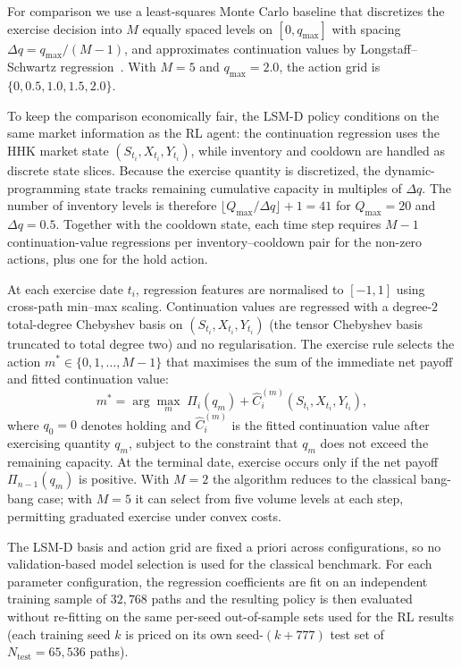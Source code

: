 \documentclass[a4paper,fleqn]{cas-dc}
\begin{document}
For comparison we use a least-squares Monte Carlo baseline that discretizes the exercise decision into $M$ equally spaced levels on $[0,q_{\max}]$ with spacing $\Delta q = q_{\max}/(M-1)$, and approximates continuation values by Longstaff--Schwartz regression~\cite{longstaff2001valuing}. With $M = 5$ and $q_{\max} = 2.0$, the action grid is $\{0, 0.5, 1.0, 1.5, 2.0\}$.

To keep the comparison economically fair, the LSM-D policy conditions on the same market information as the RL agent: the continuation regression uses the HHK market state $(S_{t_i},X_{t_i},Y_{t_i})$, while inventory and cooldown are handled as discrete state slices. Because the exercise quantity is discretized, the dynamic-programming state tracks remaining cumulative capacity in multiples of $\Delta q$. The number of inventory levels is therefore $\lfloor Q_{\max}/\Delta q \rfloor + 1 = 41$ for $Q_{\max} = 20$ and $\Delta q = 0.5$. Together with the cooldown state, each time step requires $M - 1$ continuation-value regressions per inventory--cooldown pair for the non-zero actions, plus one for the hold action.

At each exercise date $t_i$, regression features are normalised to $[-1,1]$ using cross-path min--max scaling. Continuation values are regressed with a degree-$2$ total-degree Chebyshev basis on $(S_{t_i}, X_{t_i}, Y_{t_i})$ (the tensor Chebyshev basis truncated to total degree two) and no regularisation. The exercise rule selects the action $m^* \in \{0,1,\ldots,M-1\}$ that maximises the sum of the immediate net payoff and fitted continuation value:
\[
    m^* = \arg\max_{m}\; \Pi_i(q_m) + \widehat{C}_i^{(m)}(S_{t_i},X_{t_i},Y_{t_i}),
\]
where $q_0 = 0$ denotes holding and $\widehat{C}_i^{(m)}$ is the fitted continuation value after exercising quantity $q_m$, subject to the constraint that $q_m$ does not exceed the remaining capacity. At the terminal date, exercise occurs only if the net payoff $\Pi_{n-1}(q_m)$ is positive. With $M = 2$ the algorithm reduces to the classical bang-bang case; with $M = 5$ it can select from five volume levels at each step, permitting graduated exercise under convex costs.

The LSM-D basis and action grid are fixed a priori across configurations, so no validation-based model selection is used for the classical benchmark. For each parameter configuration, the regression coefficients are fit on an independent training sample of $32{,}768$ paths and the resulting policy is then evaluated without re-fitting on the same per-seed out-of-sample sets used for the RL results (each training seed $k$ is priced on its own seed-$(k+777)$ test set of $N_{\mathrm{test}} = 65{,}536$ paths).
\end{document}
